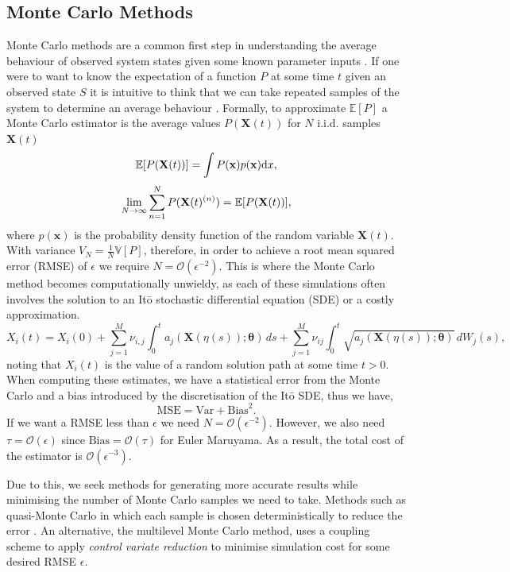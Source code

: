 \subsection{Monte Carlo Methods}
Monte Carlo methods are a common first step in understanding the average behaviour of observed system states given some known parameter inputs \cite{warneSimulationInferenceAlgorithms2019,wilkinsonStochasticModellingQuantitative2009}. If one were to want to know the expectation of a function $P$ at some time $t$ given an observed state $S$ it is intuitive to think that we can take repeated samples of the system to determine an average behaviour \cite{metropolisMonteCarloMethod1949}. Formally, to approximate $\mathbb{E}[P]$ a Monte Carlo estimator is the average values $P(\mathbf{X}(t))$ for $N$ i.i.d. samples $\mathbf{X}(t)$ 
\begin{equation}
	\mathbb{E}[P(\mathbf{X}(t))] = \int P(\mathbf{x})p(\mathbf{x}) \textrm{d}x,\notag
\end{equation}	
\begin{equation}
	\lim_{N\to\infty}\sum_{n=1}^{N} P(\mathbf{X}(t)^{(n)}) =  \mathbb{E}[P(\mathbf{X}(t))],\notag %
\end{equation}
where $p(\mathbf{x})$ is the probability density function of the random variable $\mathbf{X}(t)$. With variance $V_N = \frac{1}{N} \mathbb{V}[P]$, therefore, in order to achieve a root mean squared error (RMSE) of $\epsilon$ we require $N = \mathcal{O}(\epsilon^{-2})$. This is where the Monte Carlo method becomes computationally unwieldy, as each of these simulations often involves the solution to an It\={o} stochastic differential equation (SDE) or a costly approximation. 
\begin{equation}
	X_i(t) = X_i(0) + \sum_{j=1}^{M} \nu_{i,j} \int_0^t a_j(\mathbf{X}(\eta(s)) ; \boldsymbol{\theta}) \, ds + \sum_{j=1}^{M} \nu_{ij} \int_0^t \sqrt{a_j(\mathbf{X}(\eta(s)) ; \boldsymbol{\theta})} \, dW_j(s), \label{eqn:ItoSDE}
\end{equation}
noting that $X_i(t)$ is the value of a random solution path at some time $t>0$. When computing these estimates, we have a statistical error from the Monte Carlo and a bias introduced by the discretisation of the It\={o} SDE, thus we have, 
\begin{equation*}
	\textrm{MSE} = \textrm{Var} + \textrm{Bias}^2.
\end{equation*}
If we want a RMSE less than $\epsilon$ we need $N = \mathcal{O}(\epsilon^{-2})$. However, we also need $\tau = \mathcal{O}(\epsilon)$ since $\textrm{Bias} = \mathcal{O}(\tau)$ for Euler Maruyama. As a result, the total cost of the estimator is $\mathcal{O}(\epsilon^{-3})$. 

Due to this, we seek methods for generating more accurate results while minimising the number of Monte Carlo samples we need to take. Methods such as quasi-Monte Carlo in which each sample is chosen deterministically to reduce the error \cite{dickHighdimensionalIntegrationQuasiMonte2013}. An alternative, the multilevel Monte Carlo method, uses a coupling scheme to apply \textit{control variate reduction} to minimise simulation cost for some desired RMSE $\epsilon$. 
